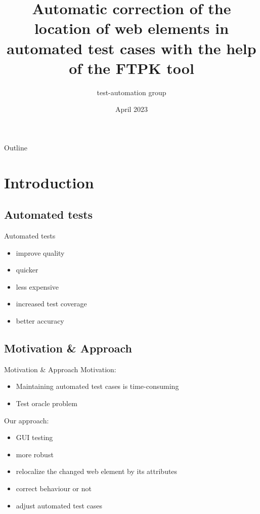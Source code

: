 \documentclass{beamer}
\title{Automatic correction of the location of web elements in automated test cases with the help of the FTPK tool}
\subtitle{}
\author{test-automation group}
\institute{ELTE}
\date{April 2023}
\begin{document}
\begin{frame}
\titlepage
\end{frame}

\begin{frame}{Outline}
\tableofcontents
\end{frame}

\section{Introduction}

\subsection{Automated tests}
\begin{frame}{Automated tests}
\begin{itemize}
    \item improve quality
    \item quicker
    \item less expensive
    \item increased test coverage
    \item better accuracy
\end{itemize}
\end{frame}

\subsection{Motivation \& Approach}
\begin{frame}{Motivation \& Approach}
Motivation: 
\begin{itemize}
    \item Maintaining automated test cases is time-consuming
    \item Test oracle problem
\end{itemize}

\vspace{5mm} %

Our approach:
\begin{itemize}
    \item GUI testing
    \item more robust
    \item relocalize the changed web element by its attributes
    \item correct behaviour or not
    \item adjust automated test cases
\end{itemize}
\end{frame}
\end{document}
